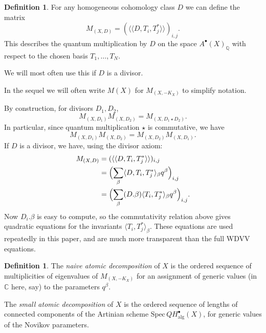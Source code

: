 \documentclass[11pt]{amsart}
\theoremstyle{plain}
\numberwithin{equation}{section}
\theoremstyle{definition}
\newtheorem{definition}[theorem]{Definition}
\theoremstyle{remark}
\begin{document}
\begin{definition}\label{dMatrixQuantumMult}
For any homogeneous cohomology class $D$ we can define the matrix 
\[
	M_{(X, D)}  = (\langle\langle D , T_i, T_j^* \rangle\rangle )_{i,j}  .
\]
This describes the quantum multiplication by $D$ on the space $A^{\bullet}(X)_{\mathbb{Q}}$ with respect to the chosen basis $T_1, \dots , T_N$. 

We will most often use this if $D$ is a divisor. 

In the sequel we will often write $M(X)$ for   $M_{(X, -K_X)}$ to simplify notation. 
\end{definition}

\noindent
By construction, for divisors $D_1, D_2$, 
\[
M_{(X, D_1)} M_{(X, D_2)}  = M_{(X, D_1\star D_2)}.
\]
In particular, since quantum multiplication $\star$ is commutative, we have
\[
	M_{(X, D_1)} M_{(X, D_2)} = M_{(X, D_2)} M_{(X, D_1)}.
\]
If $D$ is a divisor, we have, using the divisor axiom:
\begin{align*}
	M_{(X, D)} 
	&= (\langle\langle D , T_i, T_j^* \rangle\rangle )_{i,j}  \\
	&= \Bigl(\sum_\beta \langle D , T_i, T_j^* \rangle_\beta q^{\beta}\Bigr)_{i,j} \\
	&= \Bigl(\sum_\beta (D.\beta) \langle T_i, T_j^* \rangle_\beta q^{\beta}\Bigr)_{i,j} .
\end{align*}
Now $D_i.\beta$ is easy to compute, so the commutativity relation above gives quadratic equations for the invariants $\langle T_i, T_j^* \rangle_\beta$. These equations are used repeatedly in this paper, and are much more transparent than the full WDVV equations. 


\begin{definition}\label{dNaiveAtomsMorePrecise}
The \emph{naive atomic decomposition} of $X$ is the ordered sequence of multiplicities of eigenvalues of $M_{(X, -K_X)}$ for an assignment of  generic values (in $\mathbb{C}$  here, say) to the parameters $q^{\beta}$. 

The \emph{small atomic decomposition} of $X$ is the ordered sequence of lengths of connected components of the Artinian scheme  $\mathrm{Spec}\, QH^{\bullet}_{\mathrm{alg}} (X)$, for generic values of the Novikov parameters.
\end{definition}
\end{document}
